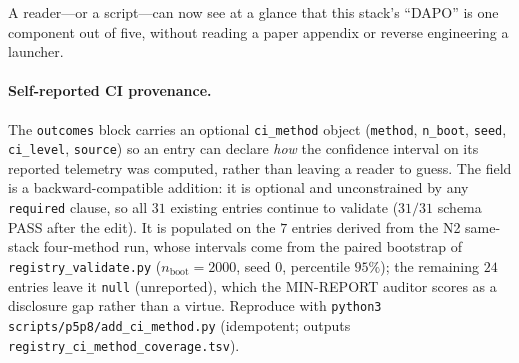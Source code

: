 A reader---or a script---can now see at a glance that this stack's ``DAPO'' is
one component out of five, without reading a paper appendix or reverse
engineering a launcher.

\paragraph{Self-reported CI provenance.} The \texttt{outcomes} block carries
an optional \texttt{ci\_method} object (\texttt{method}, \texttt{n\_boot},
\texttt{seed}, \texttt{ci\_level}, \texttt{source}) so an entry can declare
\emph{how} the confidence interval on its reported telemetry was computed,
rather than leaving a reader to guess. The field is a backward-compatible
addition: it is optional and unconstrained by any \texttt{required} clause, so
all $31$ existing entries continue to validate ($31/31$ schema PASS after the
edit). It is populated on the $7$ entries derived from the N2 same-stack
four-method run, whose intervals come from the paired bootstrap of
\texttt{registry\_validate.py} ($n_{\text{boot}}{=}2000$, seed $0$, percentile
$95\%$); the remaining $24$ entries leave it \texttt{null} (unreported), which
the MIN-REPORT auditor scores as a disclosure gap rather than a virtue.
Reproduce with \texttt{python3 scripts/p5p8/add\_ci\_method.py} (idempotent;
outputs \texttt{registry\_ci\_method\_coverage.tsv}).
